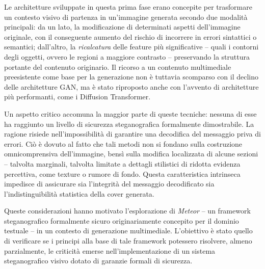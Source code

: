 Le architetture sviluppate in questa prima fase erano concepite per trasformare un contesto visivo di partenza in un'immagine generata secondo due modalità principali: da un lato, la modificazione di determinati aspetti dell'immagine originale, con il conseguente aumento del rischio di incorrere in errori sintattici o semantici; dall'altro, la \emph{ricalcatura} delle feature più significative -- quali i contorni degli oggetti, ovvero le regioni a maggiore contrasto -- preservando la struttura portante del contenuto originario. Il ricorso a un contenuto multimediale preesistente come base per la generazione non è tuttavia scomparso con il declino delle architetture GAN, ma è stato riproposto anche con l'avvento di architetture più performanti, come i Diffusion Transformer.

Un aspetto critico accomuna la maggior parte di queste tecniche: nessuna di esse ha raggiunto un livello di sicurezza steganografica formalmente dimostrabile. La ragione risiede nell'impossibilità di garantire una decodifica del messaggio priva di errori. Ciò è dovuto al fatto che tali metodi non si fondano sulla costruzione omnicomprensiva dell'immagine, bensì sulla modifica localizzata di alcune sezioni -- talvolta marginali, talvolta limitate a dettagli stilistici di ridotta evidenza percettiva, come texture o rumore di fondo. Questa caratteristica intrinseca impedisce di assicurare sia l'integrità del messaggio decodificato sia l'indistinguibilità statistica della cover generata.

Queste considerazioni hanno motivato l'esplorazione di \emph{Meteor} \cite{kaptchuk-2021} -- un framework steganografico formalmente sicuro originariamente concepito per il dominio testuale -- in un contesto di generazione multimediale. L'obiettivo è stato quello di verificare se i principi alla base di tale framework potessero risolvere, almeno parzialmente, le criticità emerse nell'implementazione di un sistema steganografico visivo dotato di garanzie formali di sicurezza.